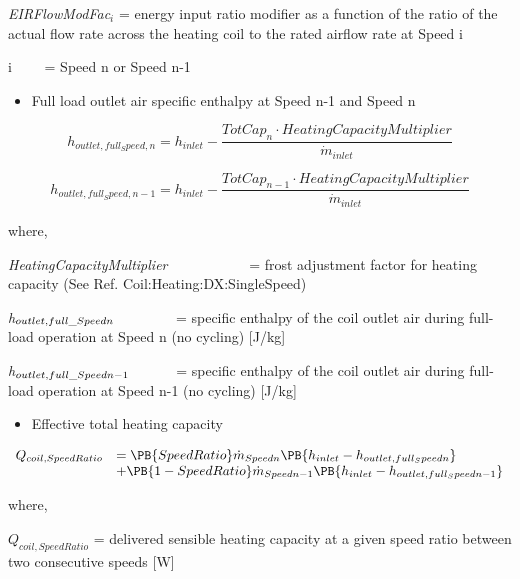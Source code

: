 \emph{EIRFlowModFac\(_{i}\)} = energy input ratio modifier as a function of the ratio of the actual flow rate across the heating coil to the rated airflow rate at Speed i

i~~~~ = Speed n or Speed n-1

\begin{itemize}
  \item Full load outlet air specific enthalpy at Speed n-1 and Speed n
\end{itemize}

\begin{equation}
  h_{outlet,full_Speed,n} = h_{inlet} - \frac{TotCap_{n} \cdot HeatingCapacityMultiplier}{\dot{m}_{inlet}}
\end{equation}

\begin{equation}
  h_{outlet,full_Speed,n-1} = h_{inlet} - \frac{TotCap_{n-1} \cdot HeatingCapacityMultiplier}{\dot{m}_{inlet}}
\end{equation}

where,

\emph{HeatingCapacityMultiplier}~~~~~~~~~~~ = frost adjustment factor for heating capacity (See Ref. Coil:Heating:DX:SingleSpeed)

\emph{h\(_{outlet,full\_Speed\\ n}\)}~~~~~~~~ = specific enthalpy of the coil outlet air during full-load operation at Speed n (no cycling) {[}J/kg{]}

\emph{h\(_{outlet,full\_Speed\\ n-1}\)}~~~~~~ = specific enthalpy of the coil outlet air during full-load operation at Speed n-1 (no cycling) {[}J/kg{]}

\begin{itemize}
  \item Effective total heating capacity
\end{itemize}

\begin{equation}
  \begin{array}{rl}
    Q_{coil,SpeedRatio} &= \PB{SpeedRatio} \dot{m}_{Speed n} \PB{h_{inlet} - h_{outlet,full_Speed n}} \\
                        &+ \PB{1 - SpeedRatio} \dot{m}_{Speed n - 1} \PB{h_{inlet} - h_{outlet,full_Speed n - 1}}
  \end{array}
\end{equation}

where,

\({{Q_{coil,SpeedRatio}}}\) = delivered sensible heating capacity at a given speed ratio between two consecutive speeds {[}W{]}

